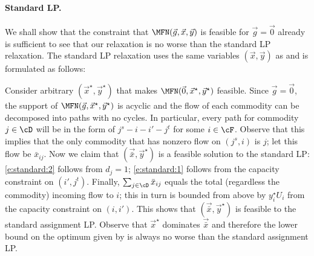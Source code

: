 \paragraph{Standard LP.} We shall show that the constraint that $\MFN(\vec g,\vec x,\vec y)$ is feasible for $\vec g=\vec
0$ already is sufficient to see that our relaxation is no worse than the standard LP relaxation. The
standard LP relaxation uses the same variables $(\vec{x},\vec{y})$ as \MFNLP and is formulated as
follows:
\begin{center}
\end{center}

Consider arbitrary $(\vec x^{\star},\vec y^{\star})$ that makes $\MFN(\vec 0,\vec
x^{\star},\vec y^{\star})$ feasible. Since $\vec g=\vec 0$, the support of $\MFN(\vec g,\vec
x^{\star},\vec y^{\star})$ is acyclic and the flow of each commodity can be decomposed into paths
with no cycles. In particular, every path for commodity $j\in\cD$ will be in the form of
$j^s-i-i'-j^t$ for some $i\in\cF$. Observe that this implies that the only commodity that has
nonzero flow on $( j^s,i)$ is $j$; let this flow be $\bar x_{ij}$. Now we claim that
$(\vec {\bar x},\vec y^{\star})$ is a feasible solution to the standard LP: \eqref{e:standard:2}
follows from $d_j=1$; \eqref{e:standard:1} follows from the capacity constraint on $(
i',j^t)$. Finally, $\sum_{j\in\cD}\bar x_{ij}$ equals the total (regardless the commodity)
incoming flow to $i$; this in turn is bounded from above by $y^{\star}_i U_i$ from the capacity
constraint on $( i,i')$. This shows that $(\vec {\bar x},\vec y^{\star})$ is feasible to
the standard assignment LP. Observe that $\vec x^{\star}$ dominates $\vec{\bar x}$ and therefore the
lower bound on the optimum given by \MFNLP is always no worse than the standard assignment LP.

